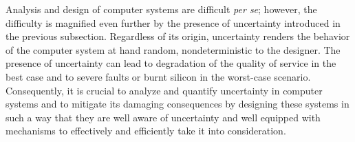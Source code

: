 Analysis and design of computer systems are difficult \emph{per se}; however,
the difficulty is magnified even further by the presence of uncertainty
introduced in the previous subsection. Regardless of its origin, uncertainty
renders the behavior of the computer system at hand random, nondeterministic to
the designer. The presence of uncertainty can lead to degradation of the quality
of service in the best case and to severe faults or burnt silicon in the
worst-case scenario. Consequently, it is crucial to analyze and quantify
uncertainty in computer systems and to mitigate its damaging consequences by
designing these systems in such a way that they are well aware of uncertainty
and well equipped with mechanisms to effectively and efficiently take it into
consideration.

